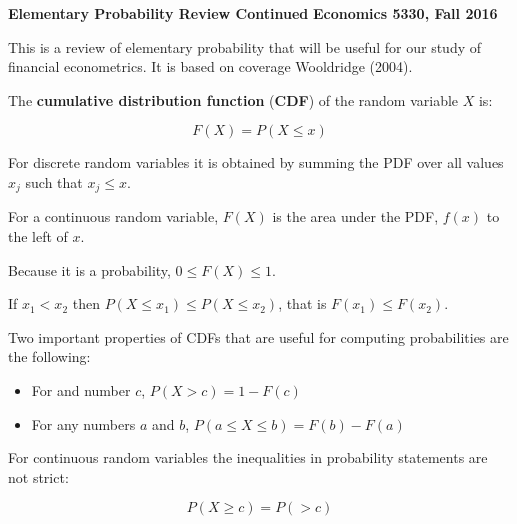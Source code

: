 \documentclass[11pt]{article}
\begin{document}
\pagestyle{empty}

\textbf{Elementary Probability Review Continued}
\textbf{Economics 5330, Fall 2016}
\vspace{3.5mm}


This is a review of elementary probability that will be useful for our study of financial econometrics. It is based on coverage Wooldridge (2004).

\vspace{3.5mm}

The \textbf{cumulative distribution function} (\textbf{CDF}) of the random variable $X$ is:

\begin{equation*}
F(X) = P(X \leq x)
\end{equation*}

\vspace{2mm}

For discrete random variables it is obtained by summing the PDF over all values $x_{j}$ such that $x_{j} \leq x$.

\vspace{2mm}

For a continuous random variable, $F(X)$ is the area under the PDF, $f(x)$ to the left of $x$.

\vspace{2mm}

Because it is a probability, $0 \leq F(X) \leq 1$.

\vspace{2mm}

If $x_{1} < x_{2}$ then $P(X \leq x_{1}) \leq P(X \leq x_{2})$, that is $F(x_{1}) \leq F(x_{2})$.

\vspace{2mm}

Two important properties of CDFs that are useful for computing probabilities are the following:

\begin{itemize}
 \item For and number $c$, $P(X > c) = 1 - F(c)$
 \item For any numbers $a$ and $b$, $P(a \leq X \leq b) = F(b) - F(a)$
\end{itemize}

\vspace{2mm}

For continuous random variables the inequalities in probability statements are not strict:

\begin{equation*}
P(X \geq c) = P( > c)
\end{equation*}
\end{document}
